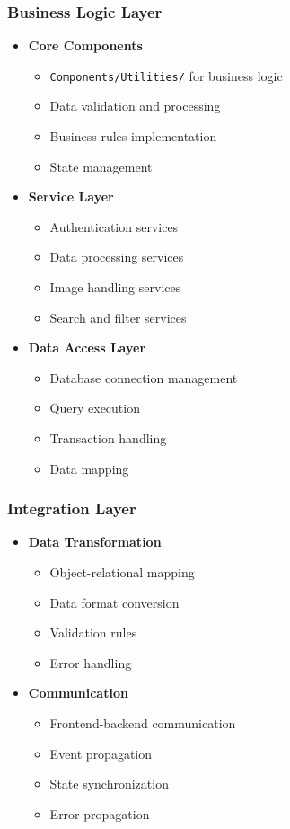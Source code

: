 \documentclass[12pt,a4paper]{article}
\begin{document}
\subsubsection{Business Logic Layer}
\begin{itemize}
    \item \textbf{Core Components}
    \begin{itemize}
        \item \texttt{Components/Utilities/} for business logic
        \item Data validation and processing
        \item Business rules implementation
        \item State management
    \end{itemize}
    
    \item \textbf{Service Layer}
    \begin{itemize}
        \item Authentication services
        \item Data processing services
        \item Image handling services
        \item Search and filter services
    \end{itemize}
    
    \item \textbf{Data Access Layer}
    \begin{itemize}
        \item Database connection management
        \item Query execution
        \item Transaction handling
        \item Data mapping
    \end{itemize}
\end{itemize}

\subsubsection{Integration Layer}
\begin{itemize}
    \item \textbf{Data Transformation}
    \begin{itemize}
        \item Object-relational mapping
        \item Data format conversion
        \item Validation rules
        \item Error handling
    \end{itemize}
    
    \item \textbf{Communication}
    \begin{itemize}
        \item Frontend-backend communication
        \item Event propagation
        \item State synchronization
        \item Error propagation
    \end{itemize}
\end{itemize}
\end{document}
